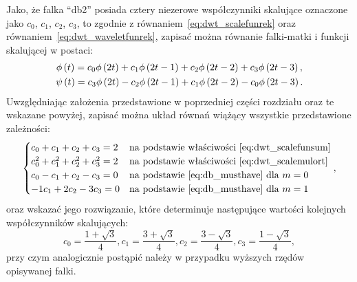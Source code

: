 Jako, że falka \enquote{db2} posiada cztery niezerowe współczynniki skalujące oznaczone jako $c_0$, $c_1$, $c_2$, $c_3$, to zgodnie z równaniem~\eqref{eq:dwt_scalefunrek} oraz równaniem~\eqref{eq:dwt_waveletfunrek}, zapisać można równanie falki-matki i funkcji skalującej w postaci:
\begin{gather}
\phi \left(t\right) = c_{0} \phi \left(2t\right) + c_{1} \phi \left( 2t - 1 \right) + c_{2} \phi \left( 2t - 2 \right) + c_{3} \phi \left( 2t - 3 \right) \label{eq:db2_scalefunrek}, \\
\psi \left(t\right) = c_{3} \phi \left(2t\right) - c_{2} \phi \left( 2t - 1 \right) + c_{1} \phi \left( 2t - 2 \right) - c_{0} \phi \left( 2t - 3 \right) \label{eq:db2_waveletfunrek}.
\end{gather}
Uwzględniając założenia przedstawione w poprzedniej części rozdziału oraz te wskazane powyżej, zapisać można układ równań wiążący wszystkie przedstawione zależności:
\begin{equation}
\begin{cases}
	c_{0} + c_{1} + c_{2} + c_{3} = 2                 & $na podstawie właściwości~\eqref{eq:dwt_scalefunsum}$ \\
	c_{0}^{2} + c_{1}^{2} + c_{2}^{2} + c_{3}^{2} = 2 & $na podstawie właściwości~\eqref{eq:dwt_scalemulort}$ \\
	c_{0} - c_{1} + c_{2} - c_{3} = 0                 & $na podstawie~\eqref{eq:db_musthave} dla $ m = 0 \\
	- 1 c_{1} + 2 c_{2} - 3 c_{3} = 0                 & $na podstawie~\eqref{eq:db_musthave} dla $ m = 1
\end{cases}
\label{eq:db2_system},
\end{equation}
oraz wskazać jego rozwiązanie, które determinuje następujące wartości kolejnych współczynników skalujących:
\begin{equation}
c_{0} = \frac{1 + \sqrt{3}}{4}, c_{1} = \frac{3 + \sqrt{3}}{4}, c_{2} = \frac{3 - \sqrt{3}}{4}, c_{3} = \frac{1 - \sqrt{3}}{4} \label{eq:db2_coefs},
\end{equation}
przy czym analogicznie postąpić należy w przypadku wyższych rzędów opisywanej falki.

